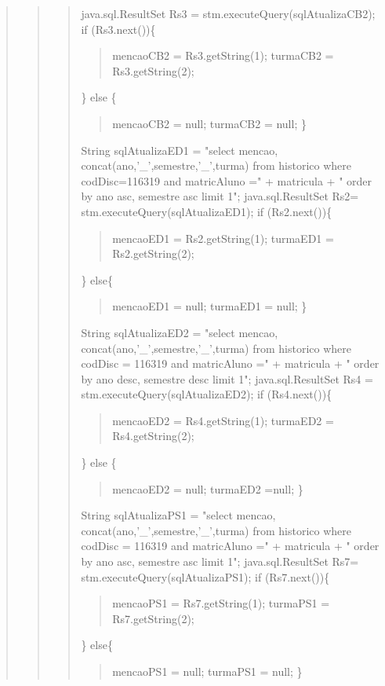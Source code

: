 \begin{quote}
\begin{quote}
\begin{quote}
			java.sql.ResultSet Rs3 = stm.executeQuery(sqlAtualizaCB2); \newline
				if (Rs3.next())\{
				\begin{quote}
					mencaoCB2 = Rs3.getString(1); \newline
					turmaCB2 = Rs3.getString(2); 
				\end{quote}
				\} else \{
				\begin{quote}
				mencaoCB2 = null; \newline
				turmaCB2 = null; \newline
					\} 
				\end{quote}
			String sqlAtualizaED1 = "select mencao, concat(ano,'\_',semestre,'\_',turma) from historico where codDisc=116319 and matricAluno =" + matricula +
			" order by ano asc, semestre asc limit 1"; \newline
			java.sql.ResultSet Rs2= stm.executeQuery(sqlAtualizaED1); \newline
			if (Rs2.next())\{
			\begin{quote}
				mencaoED1 = Rs2.getString(1); \newline
				turmaED1 = Rs2.getString(2); 
			\end{quote}
			\}
			else\{ 
			\begin{quote}
				mencaoED1 = null; \newline
				turmaED1 = null; \newline
				\} 
			\end{quote}
			String sqlAtualizaED2 = "select mencao, concat(ano,'\_',semestre,'\_',turma) from historico where codDisc = 116319 and matricAluno ="
			 + matricula + " order by ano desc, semestre desc limit 1"; \newline
			java.sql.ResultSet Rs4 = stm.executeQuery(sqlAtualizaED2); \newline
			if (Rs4.next())\{ 
			\begin{quote}
				mencaoED2 = Rs4.getString(1); \newline
				turmaED2 = Rs4.getString(2); 
			\end{quote}
			\} else \{
			\begin{quote}
			mencaoED2 = null; \newline
			turmaED2 =null; \newline
			\} 
			\end{quote}
		String sqlAtualizaPS1 = "select mencao, concat(ano,'\_',semestre,'\_',turma) from historico where codDisc = 116319 and matricAluno =" + matricula + 
		" order by ano asc, semestre asc limit 1"; \newline
		java.sql.ResultSet Rs7= stm.executeQuery(sqlAtualizaPS1); \newline
		if (Rs7.next())\{
		\begin{quote}
			mencaoPS1 = Rs7.getString(1);\newline
			turmaPS1 = Rs7.getString(2);
		\end{quote}
		\} else\{
		\begin{quote}
			mencaoPS1 = null; \newline
			turmaPS1 = null; \newline
			\}
			\end{quote}
		

\end{quote}
\end{quote}
\end{quote}
